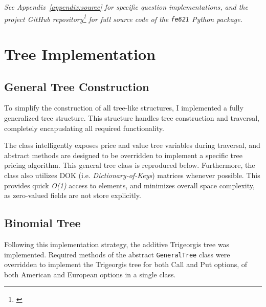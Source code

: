 \documentclass[10pt]{article}
\begin{document}
\begin{center}
    \textit{See Appendix~\ref{appendix:source} for specific question implementations, and the project GitHub repository\footnote{\cite{Weerawarana2019}} for full source code of the {\normalfont \texttt{fe621}} Python package.}
\end{center}



\newpage

\tableofcontents


\newpage


\section{Tree Implementation}

    \subsection{General Tree Construction}

    To simplify the construction of all tree-like structures, I implemented a fully generalized tree structure. This structure handles tree construction and traversal, completely encapuslating all required functionality.

    The class intelligently exposes price and value tree variables during traversal, and abstract methods are designed to be overridden to implement a specific tree pricing algorithm. This general tree class is reproduced below. Furthermore, the class also utilizes DOK (i.e. \textit{Dictionary-of-Keys}) matrices whenever possible. This provides quick \textit{O(1)} access to elements, and minimizes overall space complexity, as zero-valued fields are not store explicitly.

        
    

    \newpage
    \subsection{Binomial Tree}

    Following this implementation strategy, the additive Trigeorgis\cite{Trigeorgis1991} tree was implemented. Required methods of the abstract \texttt{GeneralTree} class were overridden to implement the Trigeorgis tree for both Call and Put options, of both American and European options in a single class.
\end{document}
